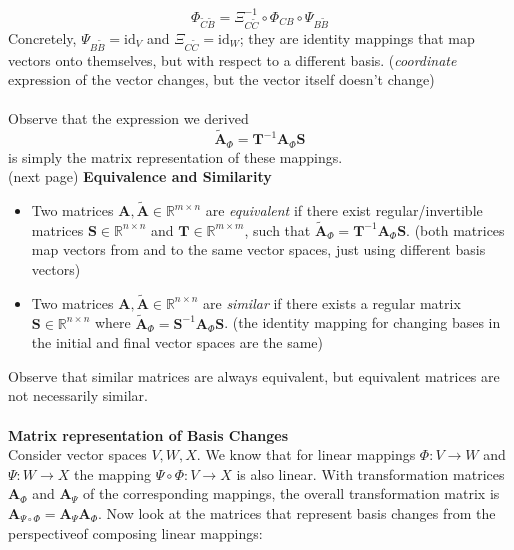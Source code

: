 \documentclass{report}
\begin{document}
\begin{equation*}
\Phi_{\tilde{C}\tilde{B}}=
\Xi^{-1}_{C\tilde{C}}\circ\Phi_{CB}\circ\Psi_{B\tilde{B}}
\end{equation*}
Concretely, $\Psi_{B\tilde{B}}=\text{id}_V$ and $\Xi_{C\tilde{C}}=\text{id}_W$; they are identity mappings
that map vectors onto themselves, but with respect to a different basis. 
(\textit{coordinate} expression of the vector changes, but the vector itself doesn't change)\\
\vspace{1mm}\\
Observe that the expression we derived
\begin{equation*}
\tilde{\bm{A}}_\Phi=\bm{T}^{-1}\bm{A}_\Phi\bm{S}
\end{equation*}
is simply the matrix representation of these mappings.\\
(next page)
\newpage
\noindent\textbf{Equivalence and Similarity}
\begin{itemize}
\item Two matrices $\bm{A},\tilde{\bm{A}}\in\mathbb{R}^{m\times n}$ are \textit{equivalent} if there 
exist regular/invertible matrices $\bm{S}\in\mathbb{R}^{n\times n}$ and $\bm{T}\in\mathbb{R}^{m\times m}$, 
such that $\tilde{\bm{A}}_\Phi=\bm{T}^{-1}\bm{A}_\Phi\bm{S}$. (both matrices map 
vectors from and to the same vector spaces, just using different basis vectors)
\item Two matrices $\bm{A},\tilde{\bm{A}}\in\mathbb{R}^{n\times n}$ are \textit{similar} if there
exists a regular matrix $\bm{S}\in\mathbb{R}^{n\times n}$ where $\tilde{\bm{A}}_\Phi=\bm{S}^{-1}\bm{A}_\Phi\bm{S}$.
(the identity mapping for changing bases in the initial and final vector spaces are the same)
\end{itemize}
Observe that similar matrices are always equivalent, but equivalent matrices are not necessarily similar.\\
\vspace{1mm}\\
\textbf{Matrix representation of Basis Changes}\\
Consider vector spaces $V,W,X$. We know that for linear mappings $\Phi:V\to W$ and $\Psi:W\to X$ the mapping
$\Psi\circ\Phi:V\to X$ is also linear.
With transformation matrices $\bm{A}_\Phi$ and $\bm{A}_\Psi$ of the corresponding mappings, the overall
transformation matrix is $\bm{A}_{\Psi\circ\Phi}=\bm{A}_\Psi\bm{A}_\Phi$. Now look at the 
matrices that represent basis changes from the perspectiveof composing linear mappings:
\end{document}
